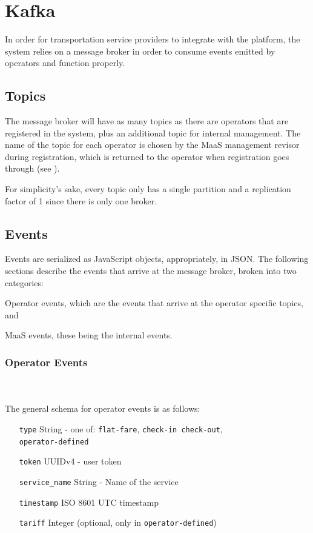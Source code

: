 \documentclass[runningheads,a4]{llncs}
\begin{document}
\section{Kafka}
\label{sec:kafka}
In order for transportation service providers to integrate with the platform,
the system relies on a message broker in order to consume events emitted by
operators and function properly.

\subsection{Topics}
\label{sec:kafka.topics}
The message broker will have as many topics as there are operators that are
registered in the system, plus an additional topic for internal management. The
name of the topic for each operator is chosen by the \ac{MaaS} management
revisor during registration, which is returned to the operator when registration
goes through (see ).

For simplicity's sake, every topic only has a single partition and a replication
factor of 1 since there is only one broker.

\subsection{Events}
\label{sec:kafka.events}
Events are serialized as JavaScript objects, appropriately, in \ac{JSON}. The
following sections describe the events that arrive at the message broker, broken
into two categories:
\begin{enumerate*}[label=(\arabic*)]
  \item Operator events, which are the events that arrive at the operator
        specific topics, and
  \item \ac{MaaS} events, these being the internal events.
\end{enumerate*}

\subsubsection{Operator Events}
\label{sec:kafka.events.operator}
~\\~\\
The general schema for operator events is as follows:

\begin{itemize}[leftmargin=8em]
  \item[\texttt{type}] String - one of: \texttt{flat-fare},
    \texttt{check-in check-out}, \\\texttt{operator-defined}
  \item[\texttt{token}] UUIDv4 - user token
  \item[\texttt{service\_name}] String - Name of the service
  \item[\texttt{timestamp}] ISO 8601 UTC timestamp
  \item[\texttt{tariff}] Integer (optional, only in \texttt{operator-defined})
\end{itemize}
\end{document}
